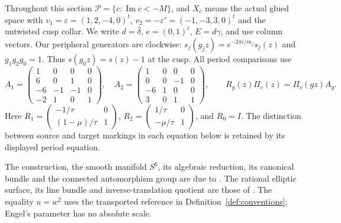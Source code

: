 Throughout this section $\mathcal P=\{c:\operatorname{Im}c<-M\}$, and $X_c$ means the actual glued space with $v_1=\varepsilon=(1,2,-4,0)^t$, $v_2=-\varepsilon'=(-1,-3,3,0)^t$ and the untwisted cusp collar. We write $d=\widehat\delta$, $e=(0,1)^t$, $E=d\gamma$, and use column vectors. Our peripheral generators are clockwise: $s_j(g_jz)=e^{-2\pi i/m_j}s_j(z)$ and $g_1g_2g_0=1$. Thus $s(g_0z)=s(z)-1$ at the cusp. All period comparisons use
\[
 A_1=\begin{pmatrix}1&0&0&0\\6&0&1&0\\-6&-1&-1&0\\-2&1&0&1\end{pmatrix},\quad
 A_2=\begin{pmatrix}1&0&0&0\\0&0&-1&0\\-6&1&0&0\\3&0&1&1\end{pmatrix},\qquad
 R_g(z)\Pi_c(z)=\Pi_c(gz)A_g.
\]
Here $R_1=\left(\begin{smallmatrix}-1/\tau&0\\(1-\mu)/\tau&1\end{smallmatrix}\right)$, $R_2=\left(\begin{smallmatrix}1/\tau&0\\-\mu/\tau&1\end{smallmatrix}\right)$, and $R_0=I$. The distinction between source and target markings in each equation below is retained by its displayed period equation.


The construction, the smooth manifold $S^6$, its algebraic reduction, its canonical bundle and the connected automorphism group are due to \cite[Main Theorem; Sections 3--9]{AC26}. The rational elliptic surface, its line bundle and inverse-translation quotient are those of \cite[Section 2]{E26}. The equality $u=w^2$ uses the transported reference in Definition~\ref{def:conventions}; Engel's parameter has no absolute scale.

